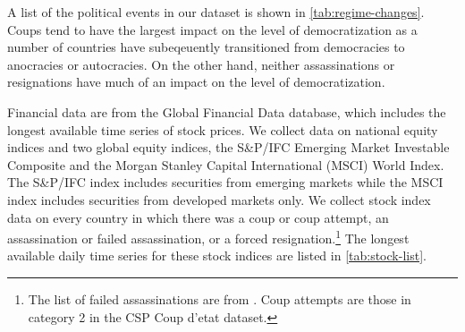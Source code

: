 \documentclass[12pt,final,fleqn]{article}
\theoremstyle{plain}
\begin{document}
A list of the political events in our dataset is shown in \autoref{tab:regime-changes}. Coups tend to have the largest impact on the level of democratization as a number of countries have subeqeuently transitioned from democracies to anocracies or autocracies. On the other hand, neither assassinations or resignations have much of an impact on the level of democratization. 

Financial data are from the Global Financial Data database, which includes the longest available time series of stock prices. We collect data on national equity indices and two global equity indices, the S\&P/IFC Emerging Market Investable Composite and the Morgan Stanley Capital International (MSCI) World Index. The S\&P/IFC index includes securities from emerging markets while the MSCI index includes securities from developed markets only. We collect stock index data on every country in which there was a coup or coup attempt, an assassination or failed assassination, or a forced resignation.\footnote{The list of failed assassinations are from \citet{jones2009hit}. Coup attempts are those in category 2 in the CSP Coup d'etat dataset.} The longest available daily time series for these stock indices are listed in \autoref{tab:stock-list}.
\end{document}
